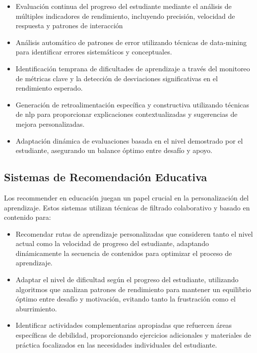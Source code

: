 \begin{itemize}
  \item Evaluación continua del progreso del estudiante mediante el análisis de múltiples indicadores de rendimiento, incluyendo precisión, velocidad de respuesta y patrones de interacción

  \item Análisis automático de patrones de error utilizando técnicas de \gls{data-mining} para identificar errores sistemáticos y conceptuales.

  \item Identificación temprana de dificultades de aprendizaje a través del monitoreo de métricas clave y la detección de desviaciones significativas en el rendimiento esperado.

  \item Generación de retroalimentación específica y constructiva utilizando técnicas de \gls{nlp} para proporcionar explicaciones contextualizadas y sugerencias de mejora personalizadas.

  \item Adaptación dinámica de evaluaciones basada en el nivel demostrado por el estudiante, asegurando un balance óptimo entre desafío y apoyo.
\end{itemize}

\subsection{Sistemas de Recomendación Educativa}
Los \gls{recommender} en educación juegan un papel crucial en la personalización del aprendizaje. Estos sistemas utilizan técnicas de filtrado colaborativo y basado en contenido para:

\begin{itemize}
  \item Recomendar rutas de aprendizaje personalizadas que consideren tanto el nivel actual como la velocidad de progreso del estudiante, adaptando dinámicamente la secuencia de contenidos para optimizar el proceso de aprendizaje.

  \item Adaptar el nivel de dificultad según el progreso del estudiante, utilizando algoritmos que analizan patrones de rendimiento para mantener un equilibrio óptimo entre desafío y motivación, evitando tanto la frustración como el aburrimiento.

  \item Identificar actividades complementarias apropiadas que refuercen áreas específicas de debilidad, proporcionando ejercicios adicionales y materiales de práctica focalizados en las necesidades individuales del estudiante.
\end{itemize}

